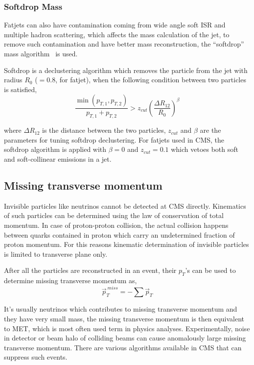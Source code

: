 \subsubsection{
  Softdrop Mass
}\label{ch_reco:softdrop}

Fatjets can also have contamination coming from wide angle
soft \gls{ISR} and multiple hadron scattering,
which affects the mass calculation of the jet, to remove
such contamination and have better mass reconstruction, the
``softdrop'' mass algorithm~\cite{softdrop-mass-2014} is used.

Softdrop is a declustering algorithm which removes the particle from the jet
with radius \( R_0 \) (\(=0.8\), for fatjet), when the following condition between two particles is satisfied,
%
\begin{equation}
  \frac{\min(p_{T,1}, p_{T,2})}{p_{T,1} + p_{T,2}} > z_{cut} {\left( \frac{\Delta R_{12}}{R_0} \right)}^{\beta}
\end{equation}

where \( \Delta R_{12} \) is the distance between the two particles, \( z_{cut} \)
and \( \beta \) are the parameters for tuning softdrop declustering.
For fatjets used in \gls{CMS}, the softdrop algorithm is applied with
\( \beta = 0\) and \( z_{cut} = 0.1\) which vetoes both soft
and soft-collinear emissions in a jet.

\subsection{
  Missing transverse momentum
}

Invisible particles like neutrinos cannot be detected at \gls{CMS} directly.
Kinematics of such particles can be determined using the law of conservation of
total momentum. In case of proton-proton collision,
the actual collision happens between quarks contained in
proton which carry an undetermined fraction of proton momentum.
For this reasons kinematic determination
of invisible particles is limited to transverse plane only.

After all the particles are reconstructed in an event, their \( p_T \)'s
can be used to determine missing transverse momentum as,
%
\begin{equation}
  \vec{p}_{T}^{~miss} = - \sum \vec{p}_{T}
\end{equation}

It's usually neutrinos which contributes to missing transverse momentum
and they have very small mass, the missing transverse momentum is then
equivalent to \gls{MET}, which is most often used term in physics analyses.
Experimentally, noise in detector or beam halo of colliding beams
can cause anomalously large missing transverse momentum. There are
various algorithms available in \gls{CMS} that can suppress such events.

